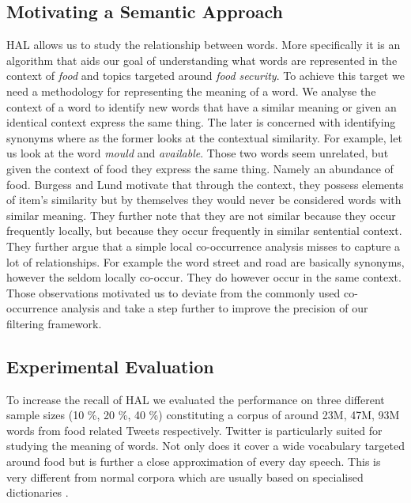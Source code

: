 \subsection{Motivating a Semantic Approach}
\label{subsec:hal}

HAL allows us to study the relationship between words. More specifically it is an algorithm that aids our goal of understanding what words are represented in the context of \emph{food} and topics targeted around \emph{food security}. To achieve this target we need a methodology for representing the meaning of a word. We analyse the context of a word to identify new words that have a similar meaning or given an identical context express the same thing. The later is concerned with identifying synonyms where as the former looks at the contextual similarity. For example, let us look at the word \emph {mould} and \emph {available}. Those two words seem unrelated, but given the context of food they express the same thing.  Namely an abundance of food. Burgess and Lund \cite{burgess98} motivate that through the context,  they possess elements of item's similarity but by themselves they would never be considered words with similar meaning. They further note that they are not similar because they occur frequently locally, but because they occur frequently in similar sentential context. They further argue  that a simple local co-occurrence analysis misses to capture a lot of relationships. For example the word street and road are basically synonyms, however the seldom locally co-occur. They do however occur in the same context. Those observations motivated us to deviate from the commonly used co-occurrence analysis and take a step further to improve the precision of our filtering framework. 







 











\subsection{Experimental Evaluation}
\label{sec:exp_eval}

To increase the recall of HAL we evaluated the performance on three different sample sizes (10 \%, 20 \%, 40 \%) constituting a corpus of around 23M, 47M, 93M words from food related Tweets respectively. Twitter is particularly suited for studying the meaning of words. Not only does it cover a wide vocabulary targeted around food but is further a close approximation of every day speech. This is very different from normal corpora which are usually based on specialised dictionaries \cite{burgess98}. 


